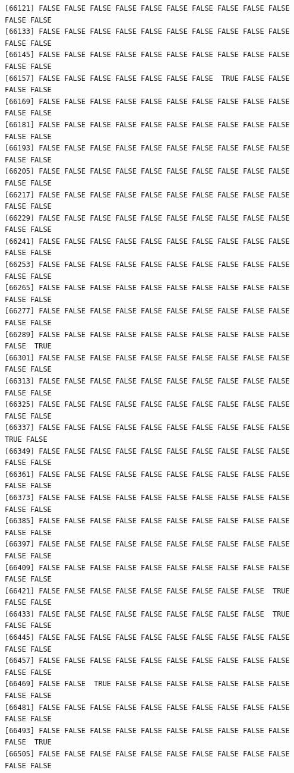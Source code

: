 \documentclass[
  a4paper,
  DIV=11,
  numbers=noendperiod]{scrartcl}
\begin{document}
\begin{verbatim}
[66121] FALSE FALSE FALSE FALSE FALSE FALSE FALSE FALSE FALSE FALSE FALSE FALSE
[66133] FALSE FALSE FALSE FALSE FALSE FALSE FALSE FALSE FALSE FALSE FALSE FALSE
[66145] FALSE FALSE FALSE FALSE FALSE FALSE FALSE FALSE FALSE FALSE FALSE FALSE
[66157] FALSE FALSE FALSE FALSE FALSE FALSE FALSE  TRUE FALSE FALSE FALSE FALSE
[66169] FALSE FALSE FALSE FALSE FALSE FALSE FALSE FALSE FALSE FALSE FALSE FALSE
[66181] FALSE FALSE FALSE FALSE FALSE FALSE FALSE FALSE FALSE FALSE FALSE FALSE
[66193] FALSE FALSE FALSE FALSE FALSE FALSE FALSE FALSE FALSE FALSE FALSE FALSE
[66205] FALSE FALSE FALSE FALSE FALSE FALSE FALSE FALSE FALSE FALSE FALSE FALSE
[66217] FALSE FALSE FALSE FALSE FALSE FALSE FALSE FALSE FALSE FALSE FALSE FALSE
[66229] FALSE FALSE FALSE FALSE FALSE FALSE FALSE FALSE FALSE FALSE FALSE FALSE
[66241] FALSE FALSE FALSE FALSE FALSE FALSE FALSE FALSE FALSE FALSE FALSE FALSE
[66253] FALSE FALSE FALSE FALSE FALSE FALSE FALSE FALSE FALSE FALSE FALSE FALSE
[66265] FALSE FALSE FALSE FALSE FALSE FALSE FALSE FALSE FALSE FALSE FALSE FALSE
[66277] FALSE FALSE FALSE FALSE FALSE FALSE FALSE FALSE FALSE FALSE FALSE FALSE
[66289] FALSE FALSE FALSE FALSE FALSE FALSE FALSE FALSE FALSE FALSE FALSE  TRUE
[66301] FALSE FALSE FALSE FALSE FALSE FALSE FALSE FALSE FALSE FALSE FALSE FALSE
[66313] FALSE FALSE FALSE FALSE FALSE FALSE FALSE FALSE FALSE FALSE FALSE FALSE
[66325] FALSE FALSE FALSE FALSE FALSE FALSE FALSE FALSE FALSE FALSE FALSE FALSE
[66337] FALSE FALSE FALSE FALSE FALSE FALSE FALSE FALSE FALSE FALSE  TRUE FALSE
[66349] FALSE FALSE FALSE FALSE FALSE FALSE FALSE FALSE FALSE FALSE FALSE FALSE
[66361] FALSE FALSE FALSE FALSE FALSE FALSE FALSE FALSE FALSE FALSE FALSE FALSE
[66373] FALSE FALSE FALSE FALSE FALSE FALSE FALSE FALSE FALSE FALSE FALSE FALSE
[66385] FALSE FALSE FALSE FALSE FALSE FALSE FALSE FALSE FALSE FALSE FALSE FALSE
[66397] FALSE FALSE FALSE FALSE FALSE FALSE FALSE FALSE FALSE FALSE FALSE FALSE
[66409] FALSE FALSE FALSE FALSE FALSE FALSE FALSE FALSE FALSE FALSE FALSE FALSE
[66421] FALSE FALSE FALSE FALSE FALSE FALSE FALSE FALSE FALSE  TRUE FALSE FALSE
[66433] FALSE FALSE FALSE FALSE FALSE FALSE FALSE FALSE FALSE  TRUE FALSE FALSE
[66445] FALSE FALSE FALSE FALSE FALSE FALSE FALSE FALSE FALSE FALSE FALSE FALSE
[66457] FALSE FALSE FALSE FALSE FALSE FALSE FALSE FALSE FALSE FALSE FALSE FALSE
[66469] FALSE FALSE  TRUE FALSE FALSE FALSE FALSE FALSE FALSE FALSE FALSE FALSE
[66481] FALSE FALSE FALSE FALSE FALSE FALSE FALSE FALSE FALSE FALSE FALSE FALSE
[66493] FALSE FALSE FALSE FALSE FALSE FALSE FALSE FALSE FALSE FALSE FALSE  TRUE
[66505] FALSE FALSE FALSE FALSE FALSE FALSE FALSE FALSE FALSE FALSE FALSE FALSE

\end{verbatim}
\end{document}
